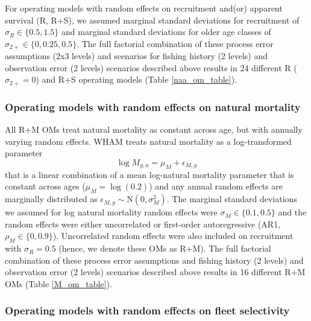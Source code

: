 \documentclass[
  12pt,
]{article}
\begin{document}
For operating models with random effects on recruitment and(or) apparent
survival (R, R+S), we assumed marginal standard deviations for
recruitment of \(\sigma_R \in \{0.5,1.5\}\) and marginal standard
deviations for older age classes of \(\sigma_{2+} \in \{0,0.25, 0.5\}\).
The full factorial combination of these process error assumptions (2x3
levels) and scenarios for fishing history (2 levels) and observation
error (2 levels) scenarios described above results in 24 different R
(\(\sigma_{2+} = 0\)) and R+S operating models (Table
\ref{naa_om_table}).

\hypertarget{operating-models-with-random-effects-on-natural-mortality}{%
\subsubsection*{Operating models with random effects on natural
mortality}\label{operating-models-with-random-effects-on-natural-mortality}}

All R+M OMs treat natural mortality as constant across age, but with
annually varying random effects. WHAM treats natural mortality as a
log-transformed parameter \[
\log M_{y,a} = \mu_{M} + \epsilon_{M,y}
\] that is a linear combination of a mean log-natural mortality
parameter that is constant across ages (\(\mu_{M} = \log(0.2)\)) and any
annual random effects are marginally distributed as
\(\epsilon_{M,y} \sim \text{N}\left(0,\sigma_M^2\right)\). The marginal
standard deviations we assumed for log natural mortality random effects
were \(\sigma_M \in \{0.1, 0.5\}\) and the random effects were either
uncorrelated or first-order autoregressive (AR1,
\(\rho_M \in \{0,0.9\}\)). Uncorrelated random effects were also
included on recruitment with \(\sigma_R = 0.5\) (hence, we denote these
OMs as R+M). The full factorial combination of these process error
assumptions and fishing history (2 levels) and observation error (2
levels) scenarios described above results in 16 different R+M OMs (Table
\ref{M_om_table}).

\hypertarget{operating-models-with-random-effects-on-fleet-selectivity}{%
\subsubsection*{Operating models with random effects on fleet
selectivity}\label{operating-models-with-random-effects-on-fleet-selectivity}}
\end{document}
